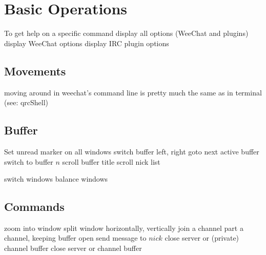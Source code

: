 
\def\content{\uppercase{Weechat}}
\def\shortcontent{\content}
\def\versionnumber{0.1}  %
\def\version{v\versionnumber\ \month\ \year}


\mytitle

\shortintro

\section{Basic Operations}{}
	{To get help on a specific command}
	{display all options (WeeChat and plugins)}
	{display WeeChat options}
	{display IRC plugin options}

\subsection{Movements}{moving around in weechat's command line is pretty much the same as in terminal (see: qrcShell)}

\subsection{Buffer}{}
	{Set unread marker on all windows}
	{switch buffer left, right}
	{goto next active buffer}
	{switch to buffer $n$}
	{scroll buffer title}
	{scroll nick list}

	{switch windows}
	{balance windows}

\subsection{Commands}{}
	{zoom into window}
	{split window horizontally, vertically}
	{join a channel}
	{part a channel, keeping buffer open}
	{send message to $nick$}
	{close server or (private) channel buffer}
	{close server or channel buffer}


